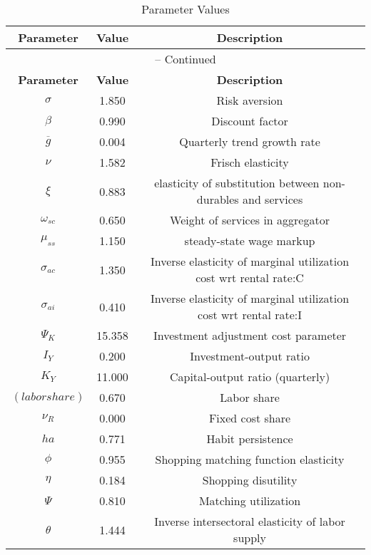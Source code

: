 \begin{center}
\begin{longtable}{ccc}
\caption{Parameter Values}\\%
\toprule%
\multicolumn{1}{c}{\textbf{Parameter}} &
\multicolumn{1}{c}{\textbf{Value}} &
 \multicolumn{1}{c}{\textbf{Description}}\\%
\midrule%
\endfirsthead
\multicolumn{3}{c}{{\tablename} \thetable{} -- Continued}\\%
\midrule%
\multicolumn{1}{c}{\textbf{Parameter}} &
\multicolumn{1}{c}{\textbf{Value}} &
  \multicolumn{1}{c}{\textbf{Description}}\\%
\midrule%
\endhead
${\sigma}$ 	 & 	 1.850 	 & 	 Risk aversion\\
${\beta}$ 	 & 	 0.990 	 & 	 Discount factor\\
${\overline{g}}$ 	 & 	 0.004 	 & 	 Quarterly trend growth rate\\
$\nu$ 	 & 	 1.582 	 & 	 Frisch elasticity\\
$\xi$ 	 & 	 0.883 	 & 	 elasticity of substitution between non-durables and services\\
$\omega_{sc}$ 	 & 	 0.650 	 & 	 Weight of services in aggregator\\
$\mu_{ss}$ 	 & 	 1.150 	 & 	 steady-state wage markup\\
${\sigma_{ac}}$ 	 & 	 1.350 	 & 	 Inverse elasticity of marginal utilization cost wrt rental rate:C\\
${\sigma_{ai}}$ 	 & 	 0.410 	 & 	 Inverse elasticity of marginal utilization cost wrt rental rate:I\\
${\Psi_{K}}$ 	 & 	 15.358 	 & 	 Investment adjustment cost parameter\\
${I_Y}$ 	 & 	 0.200 	 & 	 Investment-output ratio\\
${K_Y}$ 	 & 	 11.000 	 & 	 Capital-output ratio (quarterly)\\
$(labor share)$ 	 & 	 0.670 	 & 	 Labor share\\
${\nu_R}$ 	 & 	 0.000 	 & 	 Fixed cost share\\
${ha}$ 	 & 	 0.771 	 & 	 Habit persistence\\
${\phi}$ 	 & 	 0.955 	 & 	 Shopping matching function elasticity\\
${\eta}$ 	 & 	 0.184 	 & 	 Shopping disutility\\
${\Psi}$ 	 & 	 0.810 	 & 	 Matching utilization\\
${\theta}$ 	 & 	 1.444 	 & 	 Inverse intersectoral elasticity of labor supply\\

\end{longtable}
\end{center}

